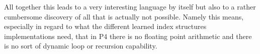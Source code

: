 All together this leads to a very interesting language by itself but also to a rather cumbersome discovery of all that is actually not possible. Namely this means, especially in regard to what the different learned index structures implementations need, that in P4 there is no floating point arithmetic and there is no sort of dynamic loop or recursion capability.
